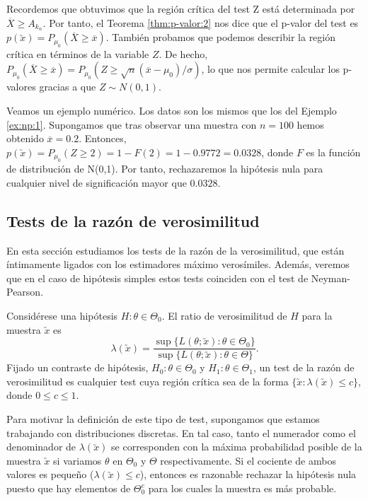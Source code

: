         \begin{ex}
            Recordemos que obtuvimos que la región crítica del test Z está determinada por $\overline{X} \ge A_{k_\alpha}$. Por tanto, el Teorema \ref{thm:p-valor:2} nos dice que el p-valor del test es $p(\utilde{x}) = P_{\mu_0}(\overline{X} \ge \overline{x})$. También probamos que podemos describir la región crítica en términos de la variable $Z$. De hecho, $P_{\mu_0}(\overline{X} \ge \overline{x}) = P_{\mu_0}(Z \ge \sqrt{n}(\overline{x} - \mu_0)/\sigma)$, lo que nos permite calcular los p-valores gracias a que $Z \sim N(0,1)$.

            Veamos un ejemplo numérico. Los datos son los mismos que los del Ejemplo \ref{ex:np:1}. Supongamos que tras observar una muestra con $n = 100$ hemos obtenido $\overline{x} = 0.2$. Entonces, $p(\utilde{x}) = P_{\mu_0}(Z \ge 2) = 1 - F(2) = 1 - 0.9772 = 0.0328$, donde $F$ es la función de distribución de N(0,1). Por tanto, rechazaremos la hipótesis nula para cualquier nivel de significación mayor que $0.0328$.
        \end{ex}

    \subsection{Tests de la razón de verosimilitud}

        En esta sección estudiamos los tests de la razón de la verosimilitud, que están íntimamente ligados con los estimadores máximo verosímiles. Además, veremos que en el caso de hipótesis simples estos tests coinciden con el test de Neyman-Pearson.

        \begin{definition}
            Considérese una hipótesis $H : \theta \in \Theta_0$. El ratio de verosimilitud de $H$ para la muestra $\utilde{x}$ es
            \[\lambda(\utilde{x}) = \frac{\sup\{L(\theta;\utilde{x}): \theta \in \Theta_0\}}{\sup\{L(\theta;\utilde{x}): \theta \in \Theta\}}. \]
            Fijado un contraste de hipótesis, $H_0 : \theta \in \Theta_0$ y $H_1 : \theta \in \Theta_1$, un test de la razón de verosimilitud es cualquier test cuya región crítica sea de la forma $\{\utilde{x} : \lambda(\utilde{x}) \le c\}$, donde $0 \le c \le 1$.
        \end{definition}

        Para motivar la definición de este tipo de test, supongamos que estamos trabajando con distribuciones discretas. En tal caso, tanto el numerador como el denominador de $\lambda(\utilde{x})$ se corresponden con la máxima probabilidad posible de la muestra $\utilde{x}$ si variamos $\theta$ en $\Theta_0$ y $\Theta$ respectivamente. Si el cociente de ambos valores es pequeño ($\lambda(\utilde{x}) \le c$), entonces es razonable rechazar la hipótesis nula puesto que hay elementos de $\Theta_0^c$ para los cuales la muestra es más probable.

